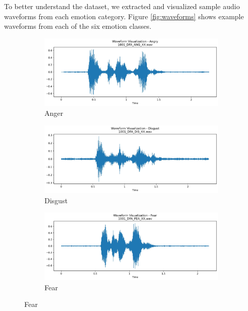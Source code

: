 To better understand the dataset, we extracted and visualized sample audio waveforms from each emotion category. Figure \ref{fig:waveforms} shows example waveforms from each of the six emotion classes.
\begin{figure}[h]
    \centering
    \begin{subfigure}[b]{0.32\textwidth}
        \includegraphics[width=\textwidth]{images/anger.jpeg}
        \caption{Anger}
    \end{subfigure}
    \begin{subfigure}[b]{0.32\textwidth}
        \includegraphics[width=\textwidth]{images/disgust.jpeg}
        \caption{Disgust}
    \end{subfigure}
    \begin{subfigure}[b]{0.32\textwidth}
        \includegraphics[width=\textwidth]{images/fear.jpeg}
        \caption{Fear}
    \end{subfigure}
    

\end{figure}
